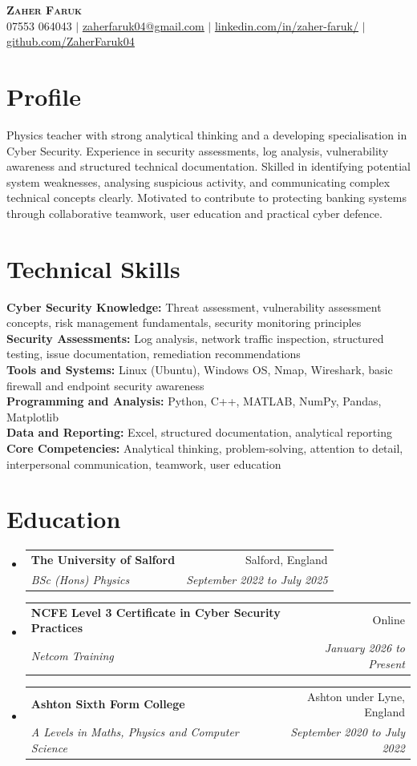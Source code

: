 \documentclass[letterpaper,11pt]{article}
\makeatletter
\newcommand{\resumeSubheading}[4]{
  \vspace{-2pt}\item
    \begin{tabular*}{0.97\textwidth}[t]{l@{\extracolsep{\fill}}r}
      \textbf{#1} & #2 \\
      \textit{\small#3} & \textit{\small #4} \\
    \end{tabular*}\vspace{-7pt}
}
\newcommand{\resumeSubHeadingListStart}{\begin{itemize}[leftmargin=0.15in, label={}]}
\newcommand{\resumeSubHeadingListEnd}{\end{itemize}}
\makeatother
\begin{document}

\begin{center}
    \textbf{\Huge \scshape Zaher Faruk} \\ \vspace{1pt}
    \small 07553 064043 $|$ \href{mailto:zaherfaruk04@gmail.com}{\underline{zaherfaruk04@gmail.com}} $|$
    \href{https://www.linkedin.com/in/zaher-faruk/}{\underline{linkedin.com/in/zaher-faruk/}} $|$
    \href{https://github.com/ZaherFaruk04}{\underline{github.com/ZaherFaruk04}}
\end{center}

\section{Profile}
\small{
Physics teacher with strong analytical thinking and a developing specialisation in Cyber Security. Experience in security assessments, log analysis, vulnerability awareness and structured technical documentation. Skilled in identifying potential system weaknesses, analysing suspicious activity, and communicating complex technical concepts clearly. Motivated to contribute to protecting banking systems through collaborative teamwork, user education and practical cyber defence.
}

\section{Technical Skills}
\small{
\textbf{Cyber Security Knowledge:} Threat assessment, vulnerability assessment concepts, risk management fundamentals, security monitoring principles \\
\textbf{Security Assessments:} Log analysis, network traffic inspection, structured testing, issue documentation, remediation recommendations \\
\textbf{Tools and Systems:} Linux (Ubuntu), Windows OS, Nmap, Wireshark, basic firewall and endpoint security awareness \\
\textbf{Programming and Analysis:} Python, C++, MATLAB, NumPy, Pandas, Matplotlib \\
\textbf{Data and Reporting:} Excel, structured documentation, analytical reporting \\
\textbf{Core Competencies:} Analytical thinking, problem-solving, attention to detail, interpersonal communication, teamwork, user education
}

\section{Education}
\resumeSubHeadingListStart
  \resumeSubheading
    {The University of Salford}{Salford, England}
    {BSc (Hons) Physics}{September 2022 to July 2025}
  \resumeSubheading
    {NCFE Level 3 Certificate in Cyber Security Practices}{Online}
    {Netcom Training}{January 2026 to Present}
  \resumeSubheading
    {Ashton Sixth Form College}{Ashton under Lyne, England}
    {A Levels in Maths, Physics and Computer Science}{September 2020 to July 2022}
\resumeSubHeadingListEnd
\end{document}
